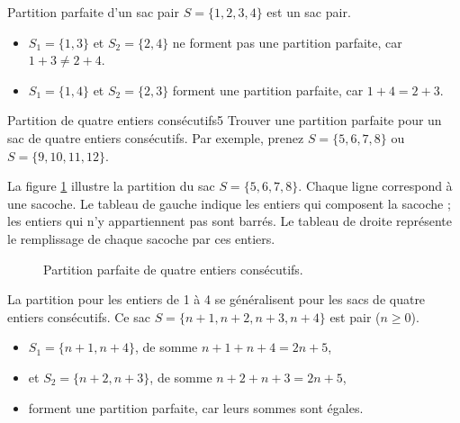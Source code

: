 \documentclass[a4paper,twoside]{article}
\begin{document}
  \begin{exemple}{Partition parfaite d'un sac pair}
    $S = \{1,2,3,4\}$ est un sac pair.
    \begin{itemize}
      \item $S_1 = \{1,3\}$ et $S_2 = \{2,4\}$ ne forment pas une partition parfaite, car $1 + 3 \neq 2 + 4$.
      \item $S_1 = \{1,4\}$ et $S_2 = \{2,3\}$ forment une partition parfaite, car $1 + 4 = 2 + 3$.
    \end{itemize}
  \end{exemple}

  \begin{exercice}{Partition de quatre entiers consécutifs}{5}
    Trouver une partition parfaite pour un sac de quatre entiers consécutifs.
    Par exemple, prenez $S = \{5, 6, 7, 8\}$ ou $S = \{9, 10, 11, 12\}$.
  \end{exercice}

  La figure \ref{fig:quatre} illustre la partition du sac $S = \{5, 6, 7, 8\}$.
  Chaque ligne correspond à une sacoche.
  Le tableau de gauche indique les entiers qui composent la sacoche ; les entiers qui n'y appartiennent pas sont barrés.
  Le tableau de droite représente le remplissage de chaque sacoche par ces entiers.
   \begin{figure}[htbp]
    \centering
    \caption{Partition parfaite de quatre entiers consécutifs.}
    \label{fig:quatre}
  \end{figure}


  \begin{solution}
    La partition pour les entiers de 1 à 4 se généralisent pour les sacs de quatre entiers consécutifs.
    Ce sac $S = \{ n + 1, n + 2, n + 3, n + 4\}$ est pair ($n \geq 0$).
    \begin{itemize}
    \item $S_1 = \{ n + 1, n + 4\}$, de somme $n + 1 + n + 4 = 2n + 5$,
    \item et $S_2 = \{n + 2, n + 3\}$, de somme $n + 2 + n + 3 = 2n + 5$,
    \item forment une partition parfaite, car leurs sommes sont égales.
    \end{itemize}
  \end{solution}
\end{document}
